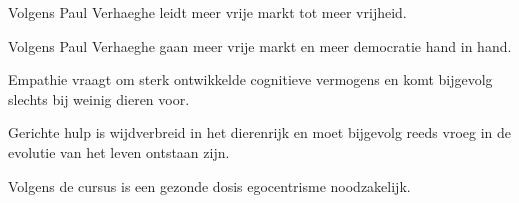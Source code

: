 \documentclass[main.tex]{subfiles}
\begin{document}
\begin{examenvraag}
    \begin{stelling}
        Volgens Paul Verhaeghe leidt meer vrije markt tot meer vrijheid.
    \end{stelling}

    \begin{antwoord}
    \end{antwoord}
\end{examenvraag}


\begin{examenvraag}
    \begin{stelling}
        Volgens Paul Verhaeghe gaan meer vrije markt en meer democratie hand in hand.
    \end{stelling}

    \begin{antwoord}
    \end{antwoord}
\end{examenvraag}


\begin{examenvraag}
    \begin{stelling}
        Empathie vraagt om sterk ontwikkelde cognitieve vermogens en komt bijgevolg slechts bij weinig dieren voor.
    \end{stelling}

    \begin{antwoord}
    \end{antwoord}
\end{examenvraag}


\begin{examenvraag}
    \begin{stelling}
        Gerichte hulp is wijdverbreid in het dierenrijk en moet bijgevolg reeds vroeg in de evolutie van het leven ontstaan zijn.
    \end{stelling}

    \begin{antwoord}
    \end{antwoord}
\end{examenvraag}


\begin{examenvraag}
    \begin{stelling}
        Volgens de cursus is een gezonde dosis egocentrisme noodzakelijk.
    \end{stelling}

    \begin{antwoord}
    \end{antwoord}
\end{examenvraag}
\end{document}
